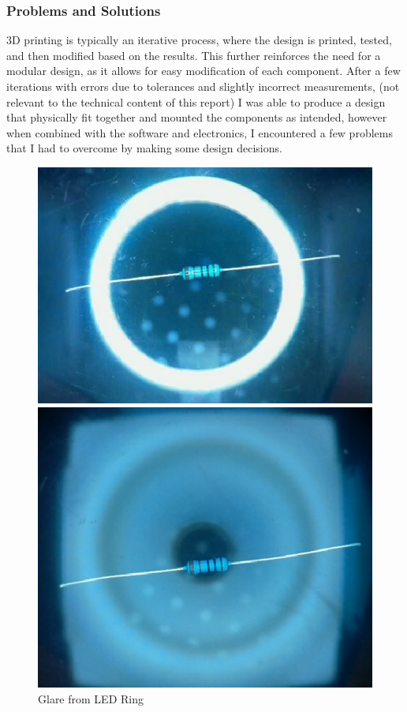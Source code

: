 \subsubsection{Problems and Solutions}
3D printing is typically an iterative process, where the design is printed, tested, and then modified based on the results.
This further reinforces the need for a modular design, as it allows for easy modification of each component.
After a few iterations with errors due to tolerances and slightly incorrect measurements, (not relevant to the technical content of this report)
I was able to produce a design that physically fit together and mounted the components as intended, however when combined with the software
and electronics, I encountered a few problems that I had to overcome by making some design decisions.

\begin{figure}
    \begin{minipage}[t]{0.49\textwidth}
        \centering
        \includegraphics[width=\textwidth]{imgs/design/ringlight.jpg}
        \caption{Glare from LED Ring}
        \label{fig:glare}
    \end{minipage}
    \hfill
    \begin{minipage}[t]{0.49\textwidth}
        \centering
        \includegraphics[width=\textwidth]{imgs/design/diffusedlight.jpg}

\end{minipage}
\end{figure}
